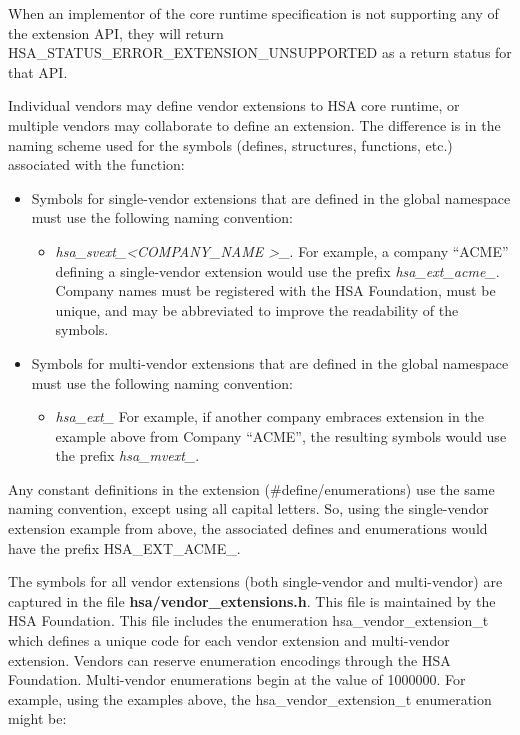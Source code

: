 \documentclass[final]{book}
\newcommand{\reftyp}[1]{#1}
\newcommand{\refenu}[1]{\reftyp{#1}}
\begin{document}
When an implementor of the core runtime specification is not supporting any of
the extension API, they will return
\refenu{HSA_STATUS_ERROR_EXTENSION_UNSUPPORTED} as a return status for that API.

Individual vendors may define vendor extensions to HSA core runtime, or multiple
vendors may collaborate to define an extension. The difference is in the naming
scheme used for the symbols (defines, structures, functions, etc.) associated
with the function:

\begin{itemize}
\item Symbols for single-vendor extensions that are defined in the global
  namespace must use the following naming convention:
  \begin{itemize}
  \item \emph{hsa_svext_\textless COMPANY_NAME \textgreater_}. For example,
    a company ``ACME'' defining a single-vendor extension would use the prefix
    \emph{hsa_ext_acme_}. Company names must be registered with the HSA
    Foundation, must be unique, and may be abbreviated to improve the
    readability of the symbols.
  \end{itemize}
\item Symbols for multi-vendor extensions that are defined in the global
  namespace must use the following naming convention:
  \begin{itemize}
  \item \emph{hsa_ext_} For example, if another company embraces extension in
    the example above from Company ``ACME'', the resulting symbols would use the
    prefix \emph{hsa_mvext_}.
  \end{itemize}
\end{itemize}

Any constant definitions in the extension (\#define/enumerations) use the same
naming convention, except using all capital letters. So, using the single-vendor
extension example from above, the associated defines and enumerations would have
the prefix \refenu{HSA_EXT_ACME_}.

The symbols for all vendor extensions (both single-vendor and multi-vendor) are
captured in the file {\bf hsa/vendor_extensions.h}. This file is maintained by
the HSA Foundation. This file includes the enumeration
\reftyp{hsa_vendor_extension_t} which defines a unique code for each vendor
extension and multi-vendor extension. Vendors can reserve enumeration encodings
through the HSA Foundation. Multi-vendor enumerations begin at the value of
1000000. For example, using the examples above, the
\reftyp{hsa_vendor_extension_t} enumeration might be:
\end{document}
